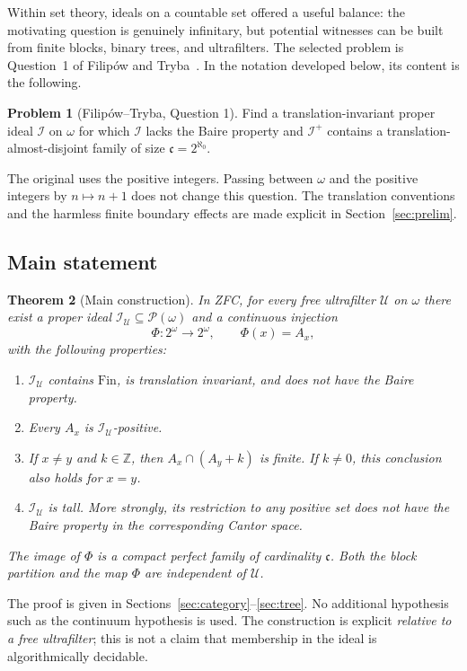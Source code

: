 \documentclass[11pt,a4paper]{article}
\newtheorem{theorem}{Theorem}[section]
\theoremstyle{definition}
\newtheorem{problem}[theorem]{Problem}
\theoremstyle{remark}
\newcommand{\I}{\mathcal I}
\newcommand{\U}{\mathcal U}
\newcommand{\Pow}{\mathcal P}
\newcommand{\Fin}{\mathrm{Fin}}
\newcommand{\cfr}{\mathfrak c}
\begin{document}
Within set theory, ideals on a countable set offered a useful balance:
the motivating question is genuinely infinitary, but potential witnesses
can be built from finite blocks, binary trees, and ultrafilters. The
selected problem is Question~1 of Filip\'ow and Tryba~\cite{FT}. In the
notation developed below, its content is the following.

\begin{problem}[Filip\'ow--Tryba, Question 1]
\label{prob:FT}
Find a translation-invariant proper ideal $\I$ on $\omega$ for which
$\I$ lacks the Baire property and $\I^+$ contains a
translation-almost-disjoint family of size $\cfr=2^{\aleph_0}$.
\end{problem}

The original uses the positive integers. Passing between $\omega$ and
the positive integers by $n\mapsto n+1$ does not change this question.
The translation conventions and the harmless finite boundary effects
are made explicit in Section~\ref{sec:prelim}.

\subsection{Main statement}
\begin{theorem}[Main construction]
\label{thm:main}
In ZFC, for every free ultrafilter $\U$ on $\omega$ there exist a proper
ideal $\I_\U\subseteq\Pow(\omega)$ and a continuous injection
\[
             \Phi:2^\omega\longrightarrow 2^\omega,
             \qquad \Phi(x)=A_x,
\]
with the following properties:
\begin{enumerate}[label=\textup{(\roman*)},itemsep=2pt]
\item $\I_\U$ contains $\Fin$, is translation invariant, and does not
have the Baire property.
\item Every $A_x$ is $\I_\U$-positive.
\item If $x\ne y$ and $k\in\mathbb Z$, then
$A_x\cap(A_y+k)$ is finite. If $k\ne0$, this conclusion also holds for
$x=y$.
\item $\I_\U$ is tall. More strongly, its restriction to any positive
set does not have the Baire property in the corresponding Cantor space.
\end{enumerate}
The image of $\Phi$ is a compact perfect family of cardinality $\cfr$.
Both the block partition and the map $\Phi$ are independent of $\U$.
\end{theorem}

The proof is given in Sections~\ref{sec:category}--\ref{sec:tree}.
No additional hypothesis such as the continuum hypothesis is used. The
construction is explicit \emph{relative to a free ultrafilter}; this is
not a claim that membership in the ideal is algorithmically decidable.
\end{document}
